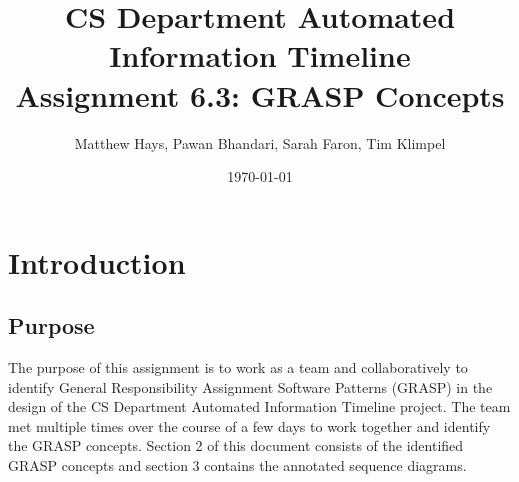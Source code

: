 \documentclass{article}
\title{CS Department Automated Information Timeline \\ Assignment 6.3: GRASP Concepts}
\date{\today}
\author{Matthew Hays, Pawan Bhandari, Sarah Faron, Tim Klimpel}
\begin{document}
\maketitle
\newpage
\tableofcontents
\listoffigures
\newpage
\section{Introduction}
\subsection{Purpose}
The purpose of this assignment is to work as a team and collaboratively to identify General Responsibility Assignment Software Patterns (GRASP) in the design of the CS Department Automated Information Timeline project. The team met multiple times over the course of a few days to work together and identify the GRASP concepts. Section 2 of this document consists of the identified GRASP concepts and section 3 contains the annotated sequence diagrams.
\end{document}
